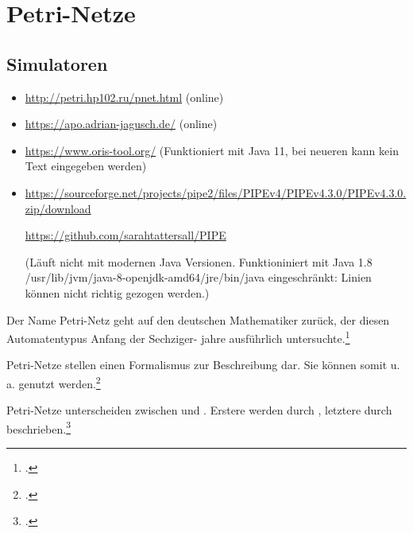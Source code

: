 \documentclass{bschlangaul-theorie}
\begin{document}
\def\TmpBeschriftung#1{%
  {%
    \footnotesize%
    \itshape#1%
  }%
}


\chapter{Petri-Netze}

\begin{liQuellen}
\item \cite[Seite 238-242]{hoffmann}
\end{liQuellen}

\section{Simulatoren}

\begin{itemize}
\item \url{http://petri.hp102.ru/pnet.html} (online)
\item \url{https://apo.adrian-jagusch.de/} (online)
\item \url{https://www.oris-tool.org/} (Funktioniert mit Java 11, bei neueren kann kein Text eingegeben werden)
\item \url{https://sourceforge.net/projects/pipe2/files/PIPEv4/PIPEv4.3.0/PIPEv4.3.0.zip/download}

\url{https://github.com/sarahtattersall/PIPE}

(Läuft nicht mit modernen Java Versionen. Funktioniniert mit Java 1.8
/usr/lib/jvm/java-8-openjdk-amd64/jre/bin/java eingeschränkt: Linien
können nicht richtig gezogen werden.)
\end{itemize}

\noindent
Der Name Petri-Netz geht auf den deutschen Mathematiker  zurück, der diesen Automatentypus Anfang der Sechziger- jahre
ausführlich untersuchte.\footcite[Seite 238]{hoffmann}

Petri-Netze stellen einen Formalismus zur Beschreibung
 dar.
%
Sie können somit u.\,a. 
genutzt werden.\footcite{sosy:fs:3}

Petri-Netze unterscheiden zwischen  und
. Erstere werden durch , letztere
durch  beschrieben.\footcite[Seite 238]{hoffmann}
\end{document}
